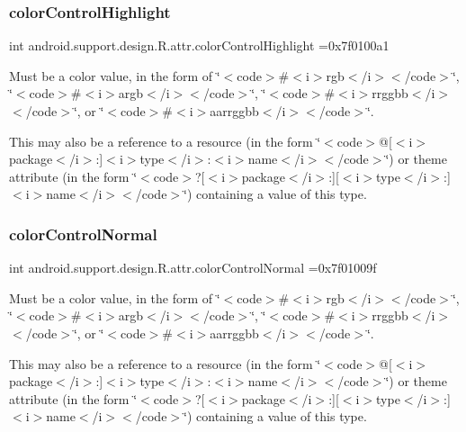 \subsubsection{\texorpdfstring{color\+Control\+Highlight}{colorControlHighlight}}
{\footnotesize\ttfamily int android.\+support.\+design.\+R.\+attr.\+color\+Control\+Highlight =0x7f0100a1\hspace{0.3cm}{\ttfamily [static]}}

Must be a color value, in the form of \char`\"{}$<$code$>$\#$<$i$>$rgb$<$/i$>$$<$/code$>$\char`\"{}, \char`\"{}$<$code$>$\#$<$i$>$argb$<$/i$>$$<$/code$>$\char`\"{}, \char`\"{}$<$code$>$\#$<$i$>$rrggbb$<$/i$>$$<$/code$>$\char`\"{}, or \char`\"{}$<$code$>$\#$<$i$>$aarrggbb$<$/i$>$$<$/code$>$\char`\"{}. 

This may also be a reference to a resource (in the form \char`\"{}$<$code$>$@\mbox{[}$<$i$>$package$<$/i$>$\+:\mbox{]}$<$i$>$type$<$/i$>$\+:$<$i$>$name$<$/i$>$$<$/code$>$\char`\"{}) or theme attribute (in the form \char`\"{}$<$code$>$?\mbox{[}$<$i$>$package$<$/i$>$\+:\mbox{]}\mbox{[}$<$i$>$type$<$/i$>$\+:\mbox{]}$<$i$>$name$<$/i$>$$<$/code$>$\char`\"{}) containing a value of this type. \mbox{\label{classandroid_1_1support_1_1design_1_1R_1_1attr_a19fe8c83cad1d93f29836a533b5011d6}} 
\subsubsection{\texorpdfstring{color\+Control\+Normal}{colorControlNormal}}
{\footnotesize\ttfamily int android.\+support.\+design.\+R.\+attr.\+color\+Control\+Normal =0x7f01009f\hspace{0.3cm}{\ttfamily [static]}}

Must be a color value, in the form of \char`\"{}$<$code$>$\#$<$i$>$rgb$<$/i$>$$<$/code$>$\char`\"{}, \char`\"{}$<$code$>$\#$<$i$>$argb$<$/i$>$$<$/code$>$\char`\"{}, \char`\"{}$<$code$>$\#$<$i$>$rrggbb$<$/i$>$$<$/code$>$\char`\"{}, or \char`\"{}$<$code$>$\#$<$i$>$aarrggbb$<$/i$>$$<$/code$>$\char`\"{}. 

This may also be a reference to a resource (in the form \char`\"{}$<$code$>$@\mbox{[}$<$i$>$package$<$/i$>$\+:\mbox{]}$<$i$>$type$<$/i$>$\+:$<$i$>$name$<$/i$>$$<$/code$>$\char`\"{}) or theme attribute (in the form \char`\"{}$<$code$>$?\mbox{[}$<$i$>$package$<$/i$>$\+:\mbox{]}\mbox{[}$<$i$>$type$<$/i$>$\+:\mbox{]}$<$i$>$name$<$/i$>$$<$/code$>$\char`\"{}) containing a value of this type. \mbox{\label{classandroid_1_1support_1_1design_1_1R_1_1attr_a541d0b27b3a34127103b8de1fcb27da8}} 
